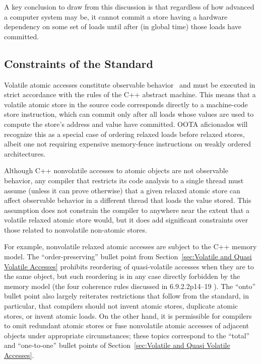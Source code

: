 \documentclass[10]{article}
\begin{document}
A key conclusion to draw from this discussion is that
regardless of how advanced a computer system may be,
it cannot commit a store having a hardware dependency on some
set of loads until after (in global time) those loads have committed.

\subsection{Constraints of the Standard}
\label{sec:Constraints of the Standard}

Volatile atomic accesses constitute observable
behavior~\cite[]{ThomasKoeppe2023N4950} and
must be executed in strict accordance with the rules of the C++ abstract
machine.
This means that a volatile atomic store in the source code
corresponds directly to a machine-code store instruction, which can
commit only after all loads whose values are used to compute the
store's address and value have committed.
OOTA aficionados will recognize this as a special case of ordering
relaxed loads before relaxed stores, albeit one not requiring
expensive memory-fence instructions on weakly ordered architectures.

Although C++ nonvolatile accesses to atomic objects are not observable
behavior, any compiler that restricts its code analysis to a
single thread must assume (unless it can prove otherwise) that a given
relaxed atomic store can affect observable behavior in a different
thread that loads the value stored.
This assumption does not constrain the compiler to anywhere near
the extent that a volatile relaxed atomic store would, but it does add
significant constraints over those related to nonvolatile non-atomic
stores.

For example, nonvolatile relaxed atomic accesses are subject to the
C++ memory model.
The ``order-preserving'' bullet point from
Section~\ref{sec:Volatile and Quasi Volatile Accesses}
prohibits reordering of quasi-volatile accesses when they are
to the same object,
but such reordering is in any case directly forbidden by the memory model
(the four coherence rules discussed in 6.9.2.2p14--19 ).
The ``onto'' bullet point also largely reiterates restrictions that follow
from the standard, in particular,
that compilers should not invent atomic stores,
duplicate atomic stores, or invent atomic loads.
On the other hand, it is permissible for compilers to omit redundant
atomic stores or fuse nonvolatile atomic accesses of adjacent objects
under appropriate circumstances;
these topics correspond to the ``total'' and ``one-to-one'' bullet points of
Section~\ref{sec:Volatile and Quasi Volatile Accesses}.
\end{document}
